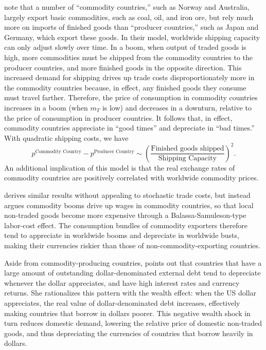 \documentclass{ar-1col}
\begin{document}
\citet{Readyetal2013} note that a number of ``commodity countries,'' such as Norway and Australia, largely export basic commodities, such as coal, oil, and iron ore, but rely much more on imports of finished goods than ``producer countries,'' such as Japan and Germany, which export these goods. In their model, worldwide shipping capacity can only adjust slowly over time. In a boom, when output of traded goods is high, more commodities must be shipped from the commodity countries to the producer countries, and more finished goods in the opposite direction. This increased demand for shipping drives up trade costs disproportionately more in the commodity countries because, in effect, any finished goods they consume must travel farther. Therefore, the price of consumption in commodity countries increases in a boom (when $m_T$ is low) and decreases in a downturn, relative to the price of consumption in producer countries. It follows that, in effect, commodity countries appreciate in ``good times'' and depreciate in ``bad times.'' With quadratic shipping costs, we have
\begin{equation*}
  p^{\text{Commodity Country}}-p^{\text{Producer Country}}\sim\left(\frac{\text{Finished goods shipped}}{\text{Shipping Capacity}}\right)^2.
\end{equation*}
An additional implication of this model is that the real exchange rates of commodity countries are positively correlated with worldwide commodity prices. 

\citet{Powers2015} derives similar results without appealing to stochastic trade costs, but instead argues commodity booms drive up wages in commodity countries, so that local non-traded goods become more expensive through a Balassa-Samuleson-type labor-cost effect. The consumption bundles of commodity exporters therefore tend to appreciate in worldwide booms and depreciate in worldwide busts, making their currencies riskier than those of non-commodity-exporting countries.

Aside from commodity-producing countries, \citet{Wiriadinata2020} points out that countries that have a large amount of outstanding dollar-denominated external debt tend to depreciate whenever the dollar appreciates, and have high interest rates and currency returns. She rationalizes this pattern with the wealth effect: when the US dollar appreciates, the real value of dollar-denominated debt increases, effectively making countries that borrow in dollars poorer. This negative wealth shock in turn reduces domestic demand, lowering the relative price of domestic non-traded goods, and thus depreciating the currencies of countries that borrow heavily in dollars.
\end{document}
